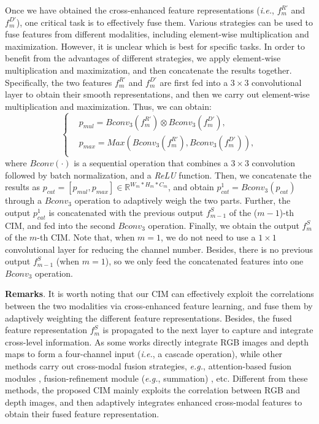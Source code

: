 \documentclass[10pt,twocolumn,letterpaper]{article}
\def\ie{\emph{i.e.}}
\def\eg{\emph{e.g.}}
\begin{document}
Once we have obtained the cross-enhanced feature representations (\ie, $f_m^{R'}$ and $f_m^{D'}$), one critical task is to effectively fuse them. Various strategies can be used to fuse features from different modalities, including element-wise multiplication and maximization. However, it is unclear which is best for specific tasks. In order to benefit from the advantages of different strategies, we apply element-wise multiplication and maximization, and then concatenate the results together. Specifically, the two features $f_m^{R'}$ and $f_m^{D'}$ are first fed into a $3\times{3}$ convolutional layer to obtain their smooth representations, and then we carry out element-wise multiplication and maximization. Thus, we can obtain:
\begin{equation}
\left\{
\begin{aligned}
&p_{mul}=Bconv_3(f_m^{R'})\otimes{Bconv_3(f_m^{D'})} ,\\
&p_{max}=Max(Bconv_3(f_m^{R'}),{Bconv_3(f_m^{D'})}) , \\
\end{aligned}
\right.
\end{equation}
where $Bconv(\cdot)$ is a sequential operation that combines a $3\times{3}$ convolution followed by
batch normalization, and a \emph{ReLU} function. Then, we concatenate the results as $p_{cat}=[p_{mul},p_{max}]\in\mathbb{R}^{W_m*H_m*C_m}$, and obtain $p_{cat}^1=Bconv_{3}(p_{cat})$ through a $Bconv_3$ operation to adaptively weigh the two parts. Further, the output $p_{cat}^1$ is concatenated with the previous output $f_{m-1}^{S}$ of the ($m-1$)-th CIM, and fed into the second $Bconv_3$ operation. Finally, we obtain the output $f_m^{S}$ of the $m$-th CIM. Note that, when $m=1$, we do not need to use a $1\times1$ convolutional layer for reducing the channel number. Besides, there is no previous output $f_{m-1}^{S}$ (when $m=1$), so we only feed the concatenated features into one $Bconv_3$ operation.

\textbf{Remarks}. It is worth noting that our CIM can effectively exploit the correlations between the two modalities via cross-enhanced feature learning, and fuse them by adaptively weighting the different feature representations. Besides, the fused feature representation ${f}_m^{S}$ is propagated to the next layer to capture and integrate cross-level information. As some works \cite{liu2019salient,peng2014rgbd,song2017depth} directly integrate RGB images and depth maps to form a four-channel input (\ie, a cascade operation), while other methods carry out cross-modal fusion strategies, \eg, attention-based fusion modules \cite{chen2019three,chen2018attention}, fusion-refinement module (\eg, summation) \cite{liu2019two}, etc. Different from these methods, the proposed CIM mainly exploits the correlation between RGB and depth images, and then adaptively integrates enhanced cross-modal features to obtain their fused feature representation.
\end{document}
